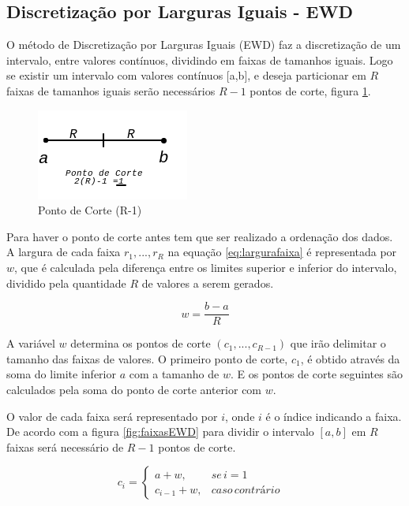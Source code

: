 \subsection{Discretização por Larguras Iguais - EWD}\label{cap:refTeor:subsec:ewd}

O método de Discretização por Larguras Iguais (EWD) faz a discretização de um intervalo, entre valores contínuos, dividindo em faixas de tamanhos iguais. Logo se existir um intervalo com valores contínuos [a,b], e deseja particionar em ${R}$ faixas de tamanhos iguais serão necessários ${R-1}$ pontos de corte, figura \ref{fig:pontocorte}. 

\begin{figure}[h]
        \centering
        \includegraphics[scale=1]{figs/faixaA-B_PontoCorte.png}
        \caption{Ponto de Corte (R-1)} \label{fig:pontocorte}
\end{figure}

Para haver o ponto de corte antes tem que ser realizado a ordenação dos dados. A largura de cada faixa ${r_1,...,r_R}$ na equação \ref{eq:largurafaixa} é representada por ${w}$, que é calculada pela diferença entre os limites superior e inferior do intervalo, dividido pela quantidade ${R}$ de valores a serem gerados.

\begin{equation}
 w = \frac{b-a}{R}
 \label{eq:largurafaixa}
\end{equation}

A variável ${w}$ determina os pontos de corte ${(c_1,...,c_{R-1})}$ que irão delimitar o tamanho das faixas de valores. O primeiro ponto de corte, ${c_1}$, é obtido através da soma do limite inferior ${a}$ com a tamanho de ${w}$. E os pontos de corte seguintes são calculados pela soma do ponto de corte anterior com ${w}$.


O valor de cada faixa será representado por ${i}$, onde ${i}$ é o índice indicando a faixa. De acordo com a figura \ref{fig:faixasEWD} para dividir o intervalo ${[a,b]}$ em ${R}$ faixas será necessário de ${R-1}$ pontos de corte.

\begin{equation}
c_i=\left\{\begin{matrix}
a+w, & se\, i=1 & \\ 
c_{i-1}+w,  & caso\, contrário & 
\end{matrix}\right.
 \label{eq:regratamfaixa}
\end{equation}

